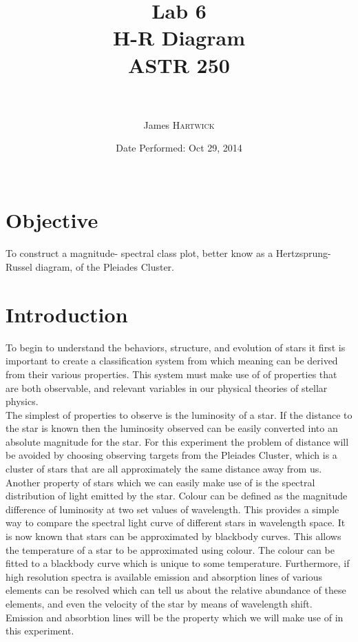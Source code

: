 \documentclass{article}
\title{Lab 6 \\ H-R Diagram \\ ASTR 250\\ \ \\ } %
\author{James \textsc{Hartwick}} %
\date{Date Performed: Oct 29, 2014\\ \ } %
\begin{document}
\maketitle %


\section{Objective}
To construct a magnitude- spectral class plot, better know as a Hertzsprung-Russel diagram, of the Pleiades Cluster.\\
\section{Introduction}
To begin to understand the behaviors, structure, and evolution of stars it first is important to create a classification system from which meaning can be derived from their various properties. This system must make use of of properties that are both observable, and relevant variables in our physical theories of stellar physics.\\

The simplest of properties to observe is the luminosity of a star. If the distance to the star is known then the luminosity observed can be easily converted into an absolute magnitude for the star. For this experiment the problem of distance will be avoided by choosing observing targets from the Pleiades Cluster, which is a cluster of stars that are all approximately the same distance away from us.\\

Another property of stars which we can easily make use of is the spectral distribution of light emitted by the star. Colour can be defined as the magnitude difference of luminosity at two set values of wavelength. This provides a simple way to compare the spectral light curve of different stars in wavelength space. It is now known that stars can be approximated by blackbody curves. This allows the temperature of a star to be approximated using colour. The colour can be fitted to a blackbody curve which is unique to some temperature. Furthermore, if high resolution spectra is available emission and absorption lines of various elements can be resolved which can tell us about the relative abundance of these elements, and even the velocity of the star by means of wavelength shift. Emission and absorbtion lines will be the property which we will make use of in this experiment.\\
\end{document}
